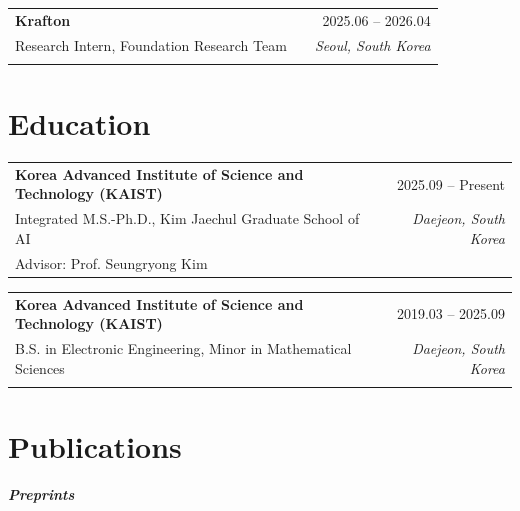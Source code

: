 \documentclass[a4paper,10.5pt]{article}
\makeatletter
\newenvironment{educationlong}[5]
{
    \noindent
    \begin{tabularx}{\linewidth}{@{} l X r @{}}
    \textbf{#1} & \hfill & #2 \\
    #3 & \hfill & #4 \\
    #5 & \hfill &
    \end{tabularx}
    \par\nobreak
}
{
}
\makeatother
\begin{document}
\begin{educationlong}
{Krafton}
{2025.06 -- 2026.04}
{Research Intern, Foundation Research Team}
{\textit{Seoul, South Korea}}
{}
\end{educationlong}


\section{Education}

\begin{educationlong}
{Korea Advanced Institute of Science and Technology (KAIST)}
{2025.09 -- Present}
{Integrated M.S.-Ph.D., Kim Jaechul Graduate School of AI}
{\textit{Daejeon, South Korea}}
{Advisor: Prof. Seungryong Kim}
\end{educationlong}

\begin{educationlong}
{Korea Advanced Institute of Science and Technology (KAIST)}
{2019.03 -- 2025.09}
{B.S. in Electronic Engineering, Minor in Mathematical Sciences}
{\textit{Daejeon, South Korea}}
{}
\end{educationlong}


\section{Publications}

\textit{\textbf{Preprints}}
\end{document}
